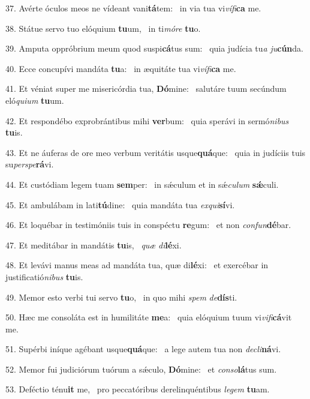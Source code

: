 37. Avérte óculos meos ne vídeant vani\textbf{tá}tem: \ast\  in via tua vi\textit{ví}\textit{fi}\textbf{ca} me.\

38. Státue servo tuo elóquium \textbf{tu}um, \ast\  in ti\textit{mó}\textit{re} \textbf{tu}o.\

39. Amputa oppróbrium meum quod suspi\textbf{cá}tus sum: \ast\  quia judícia tu\textit{a} \textit{ju}\textbf{cún}da.\

40. Ecce concupívi mandáta \textbf{tu}a: \ast\  in æquitáte tua vi\textit{ví}\textit{fi}\textbf{ca} me.\

41. Et véniat super me misericórdia tua, \textbf{Dó}mine: \ast\  salutáre tuum secúndum eló\textit{qui}\textit{um} \textbf{tu}um.\

42. Et respondébo exprobrántibus mihi \textbf{ver}bum: \ast\  quia sperávi in sermó\textit{ni}\textit{bus} \textbf{tu}is.\

43. Et ne áuferas de ore meo verbum veritátis usque\textbf{quá}que: \ast\  quia in judíciis tuis su\textit{per}\textit{spe}\textbf{rá}vi.\

44. Et custódiam legem tuam \textbf{sem}per: \ast\  in sǽculum et in sǽ\textit{cu}\textit{lum} \textbf{sǽ}culi.\

45. Et ambulábam in lati\textbf{tú}dine: \ast\  quia mandáta tua \textit{ex}\textit{qui}\textbf{sí}vi.\

46. Et loquébar in testimóniis tuis in conspéctu \textbf{re}gum: \ast\  et non \textit{con}\textit{fun}\textbf{dé}bar.\

47. Et meditábar in mandátis \textbf{tu}is, \ast\  \textit{quæ} \textit{di}\textbf{lé}xi.\

48. Et levávi manus meas ad mandáta tua, quæ di\textbf{lé}xi: \ast\  et exercébar in justificatió\textit{ni}\textit{bus} \textbf{tu}is.\

49. Memor esto verbi tui servo \textbf{tu}o, \ast\  in quo mihi \textit{spem} \textit{de}\textbf{dís}ti.\

50. Hæc me consoláta est in humilitáte \textbf{me}a: \ast\  quia elóquium tuum vi\textit{vi}\textit{fi}\textbf{cá}vit me.\

51. Supérbi iníque agébant usque\textbf{quá}que: \ast\  a lege autem tua non \textit{de}\textit{cli}\textbf{ná}vi.\

52. Memor fui judiciórum tuórum a sǽculo, \textbf{Dó}mine: \ast\  et \textit{con}\textit{so}\textbf{lá}tus sum.\

53. Deféctio ténu\textbf{it} me, \ast\  pro peccatóribus derelinquéntibus \textit{le}\textit{gem} \textbf{tu}am.\

